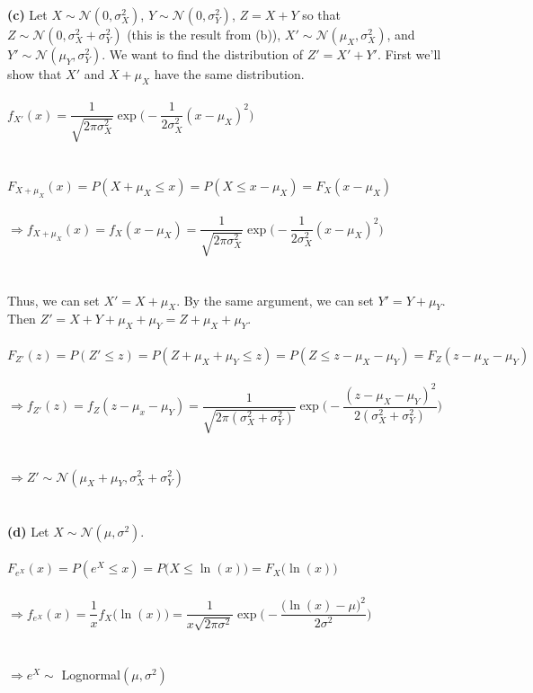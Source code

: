 \documentclass[submit]{harvardml}
\newcommand{\N}{\mathcal{N}}
\begin{document}
\textbf{(c)} Let $X\sim\N(0,\sigma_X^2)$, $Y\sim\N(0,\sigma_Y^2)$, $Z=X+Y$ so that $Z\sim\N(0,\sigma_X^2+\sigma_Y^2)$ (this is the result from (b)), $X'\sim\N(\mu_X,\sigma_X^2)$, and $Y'\sim\N(\mu_Y,\sigma_Y^2)$. We want to find the distribution of $Z'=X'+Y'$. First we'll show that $X'$ and $X+\mu_X$ have the same distribution.\\\\
$f_{X'}(x)=\displaystyle\dfrac{1}{\sqrt{2\pi\sigma_X^{2}}}\exp\Bigg(-\displaystyle\dfrac{1}{2\sigma_X^{2}}(x-\mu_X)^{2}\Bigg)$\\\\\\
$F_{X+\mu_X}(x)=P(X+\mu_X\leq x)=P(X\leq x-\mu_X)=F_{X}(x-\mu_X)$\\\\
$\Rightarrow f_{X+\mu_X}(x)=f_{X}(x-\mu_X)=\displaystyle\dfrac{1}{\sqrt{2\pi\sigma_X^{2}}}\exp\Bigg(-\displaystyle\dfrac{1}{2\sigma_X^{2}}(x-\mu_X)^{2}\Bigg)$\\\\\\
Thus, we can set $X'=X+\mu_X$. By the same argument, we can set $Y'=Y+\mu_Y$. Then $Z'=X+Y+\mu_X+\mu_Y=Z+\mu_X+\mu_Y$.\\\\
$F_{Z'}(z)=P(Z'\leq z)=P(Z+\mu_X+\mu_Y\leq z)=P(Z\leq z-\mu_X-\mu_Y)=F_Z(z-\mu_X-\mu_Y)$\\\\
$\Rightarrow f_{Z'}(z)=f_Z(z-\mu_x-\mu_Y)=\displaystyle\dfrac{1}{\sqrt{2\pi(\sigma_X^{2}+\sigma_Y^{2})}}\exp\Bigg(-\dfrac{(z-\mu_X-\mu_Y)^2}{2(\sigma_X^2+\sigma_Y^2)}\Bigg)$\\\\\\
$\Rightarrow Z'\sim\N(\mu_X+\mu_Y,\sigma_X^{2}+\sigma_Y^{2})$\\\\\\

\textbf{(d)} Let $X\sim\N(\mu, \sigma^2)$.\\\\
$F_{e^X}(x)=P(e^X\leq x)=P\big(X\leq \ln(x)\big)=F_X\big(\ln(x)\big)$\\\\
$\Rightarrow f_{e^X}(x)=\dfrac{1}{x}f_X\big(\ln(x)\big)=\dfrac{1}{x\sqrt{2\pi\sigma^2}}\exp\Bigg(-\dfrac{\big(\ln(x)-\mu\big)^2}{2\sigma^2}\Bigg)$\\\\\\
$\Rightarrow e^X\sim$ Lognormal$(\mu, \sigma^2)$
\end{document}
